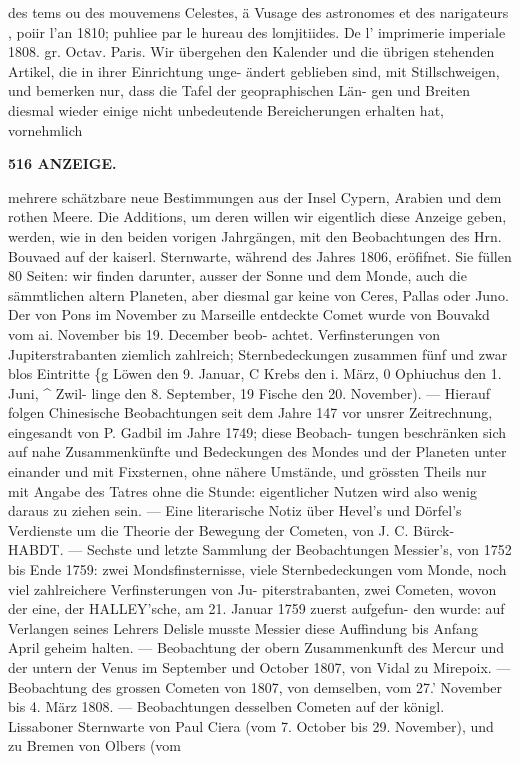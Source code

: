 \documentclass[12pt,a4paper]{article}
\begin{document}
des  tems  ou  des  mouvemens  Celestes,  ä  Vusage  des  astronomes  et  des  narigateurs ,  poiir l'an  1810;  puhliee  par  le  hureau  des  lomjitiides.     De  l' imprimerie  imperiale  1808.     gr.  Octav.     Paris. Wir  übergehen  den  Kalender  und  die  übrigen  stehenden  Artikel,  die  in  ihrer  Einrichtung  unge- ändert  geblieben  sind,  mit  Stillschweigen,  und  bemerken  nur,  dass  die  Tafel  der  geopraphischen  Län- gen und  Breiten  diesmal  wieder  einige  nicht   unbedeutende  Bereicherungen  erhalten  hat,    vornehmlich

\vspace{0.5em}


\noindent\textbf{516  ANZEIGE.}

mehrere  schätzbare  neue  Bestimmungen  aus  der  Insel  Cypern,  Arabien  und  dem  rothen  Meere.  Die Additions,  um  deren  willen  wir  eigentlich  diese  Anzeige  geben,  werden,  wie  in  den  beiden  vorigen Jahrgängen,  mit  den  Beobachtungen  des  Hrn.  Bouvaed  auf  der  kaiserl.  Sternwarte,  während  des  Jahres 1806,  eröfifnet.  Sie  füllen  80  Seiten:  wir  finden  darunter,  ausser  der  Sonne  und  dem  Monde,  auch  die sämmtlichen  altern  Planeten,  aber  diesmal  gar  keine  von  Ceres,  Pallas  oder  Juno.  Der  von  Pons  im November  zu  Marseille  entdeckte  Comet  wurde  von  Bouvakd  vom  ai.  November  bis  19.  December  beob- achtet. Verfinsterungen  von  Jupiterstrabanten  ziemlich  zahlreich;  Sternbedeckungen  zusammen  fünf und  zwar  blos  Eintritte  \{g  Löwen  den  9.  Januar,  C  Krebs  den  i.  März,  0  Ophiuchus  den  1.  Juni,  \textasciicircum{}  Zwil- linge den  8.  September,  19  Fische  den  20.  November).  ---  Hierauf  folgen  Chinesische  Beobachtungen seit  dem  Jahre  147  vor  unsrer  Zeitrechnung,  eingesandt  von  P.  Gadbil  im  Jahre  1749;  diese  Beobach- tungen beschränken  sich  auf  nahe  Zusammenkünfte  und  Bedeckungen  des  Mondes  und  der  Planeten  unter einander  und  mit  Fixsternen,  ohne  nähere  Umstände,  und  grössten  Theils  nur  mit  Angabe  des  Tatres ohne  die  Stunde:  eigentlicher  Nutzen  wird  also  wenig  daraus  zu  ziehen  sein.  ---  Eine  literarische  Notiz über  Hevel's  und  Dörfel's  Verdienste  um  die  Theorie  der  Bewegung  der  Cometen,  von  J.  C.  Bürck- HABDT.  ---  Sechste  und  letzte  Sammlung  der  Beobachtungen  Messier's,  von  1752  bis  Ende  1759:  zwei Mondsfinsternisse,  viele  Sternbedeckungen  vom  Monde,  noch  viel  zahlreichere  Verfinsterungen  von  Ju- piterstrabanten, zwei  Cometen,  wovon  der  eine,  der  HALLEY'sche,  am  21.  Januar  1759  zuerst  aufgefun- den wurde:  auf  Verlangen  seines  Lehrers  Delisle  musste  Messier  diese  Auffindung  bis  Anfang  April geheim  halten.  ---  Beobachtung  der  obern  Zusammenkunft  des  Mercur  und  der  untern  der  Venus  im September  und  October  1807,  von  Vidal  zu  Mirepoix.  ---  Beobachtung  des  grossen  Cometen  von  1807, von  demselben,  vom  27.' November  bis  4.  März  1808.  ---  Beobachtungen  desselben  Cometen  auf  der königl.  Lissaboner  Sternwarte  von  Paul  Ciera  (vom  7.  October  bis  29.  November),  und  zu  Bremen  von Olbers  (vom  
\end{document}
